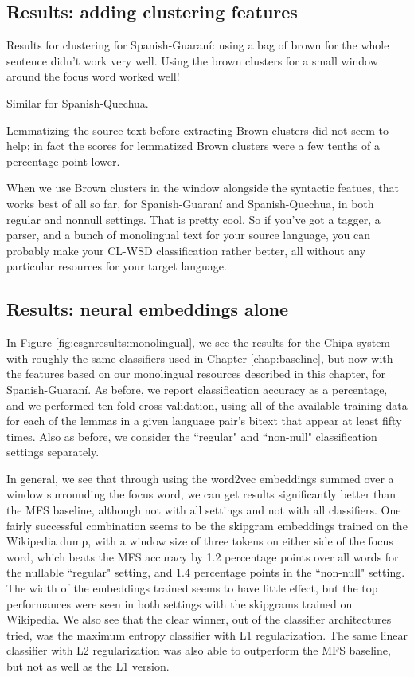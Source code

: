 
\subsection{Results: adding clustering features}
Results for clustering for Spanish-Guaraní:
using a bag of brown for the whole sentence didn't work very well.
Using the brown clusters for a small window around the focus word worked well!

Similar for Spanish-Quechua.

Lemmatizing the source text before extracting
Brown clusters did not seem to help; in fact the scores for lemmatized Brown
clusters were a few tenths of a percentage point lower.  

When we use Brown clusters in the window alongside the syntactic featues, that
works best of all so far, for Spanish-Guaraní and Spanish-Quechua, in both
regular and nonnull settings. That is pretty cool. So if you've got a tagger,
a parser, and a bunch of monolingual text for your source language, you can
probably make your CL-WSD classification rather better, all without any
particular resources for your target language.

\subsection{Results: neural embeddings alone}
In Figure \ref{fig:esgnresults:monolingual}, we see the results for the Chipa
system with roughly the same classifiers used in Chapter \ref{chap:baseline},
but now with the features based on our monolingual resources described in this
chapter, for Spanish-Guaraní. As before, we report classification accuracy
as a percentage, and we performed ten-fold cross-validation, using all of the
available training data for each of the lemmas in a given language pair's
bitext that appear at least fifty times. Also as before, we consider the
``regular" and ``non-null" classification settings separately.

In general, we see that through using the word2vec embeddings summed over a
window surrounding the focus word, we can get results significantly better than
the MFS baseline, although not with all settings and not with all classifiers.
One fairly successful combination seems to be the skipgram embeddings trained
on the Wikipedia dump, with a window size of three tokens on either side of the
focus word, which beats the MFS accuracy by 1.2 percentage points over all
words for the nullable ``regular" setting, and 1.4 percentage points in the
``non-null" setting. The width of the embeddings trained seems to have little
effect, but the top performances were seen in both settings with the skipgrams
trained on Wikipedia. We also see that the clear winner, out of the classifier
architectures tried, was the maximum entropy classifier with L1 regularization.
The same linear classifier with L2 regularization was also able to outperform
the MFS baseline, but not as well as the L1 version.

